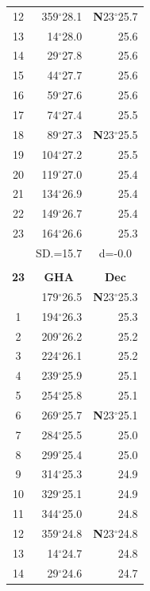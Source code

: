 \documentclass[10pt, a4paper]{report}
\begin{document}
\begin{scriptsize}
\begin{tabular*}{0.2\textwidth}[t]{@{\extracolsep{\fill}}|c|rr|}
12 & 359$^\circ$28.1 & \textbf{N}23$^\circ$25.7\\
13 & 14$^\circ$28.0 & 25.6\\
14 & 29$^\circ$27.8 & 25.6\\
15 & 44$^\circ$27.7 & \raisebox{0.24ex}{\boldmath$\cdot$~\boldmath$\cdot$~~}25.6\\
16 & 59$^\circ$27.6 & 25.6\\
17 & 74$^\circ$27.4 & 25.5\\[2Pt]
18 & 89$^\circ$27.3 & \textbf{N}23$^\circ$25.5\\
19 & 104$^\circ$27.2 & 25.5\\
20 & 119$^\circ$27.0 & 25.4\\
21 & 134$^\circ$26.9 & \raisebox{0.24ex}{\boldmath$\cdot$~\boldmath$\cdot$~~}25.4\\
22 & 149$^\circ$26.7 & 25.4\\
23 & 164$^\circ$26.6 & 25.3\\
\hline
\rule{0pt}{2.4ex} & \multicolumn{1}{c}{SD.=15.7} & \multicolumn{1}{c|}{d=-0.0}\\
\hline
\multicolumn{1}{c}{}\\[-0.5ex]\hline
\multicolumn{1}{|c|}{\rule{0pt}{2.6ex}\textbf{23}} & \multicolumn{1}{c}{\textbf{GHA}} & \multicolumn{1}{c|}{\textbf{Dec}}\\
\hline\rule{0pt}{2.6ex}\noindent
0 & 179$^\circ$26.5 & \textbf{N}23$^\circ$25.3\\
1 & 194$^\circ$26.3 & 25.3\\
2 & 209$^\circ$26.2 & 25.2\\
3 & 224$^\circ$26.1 & \raisebox{0.24ex}{\boldmath$\cdot$~\boldmath$\cdot$~~}25.2\\
4 & 239$^\circ$25.9 & 25.1\\
5 & 254$^\circ$25.8 & 25.1\\[2Pt]
6 & 269$^\circ$25.7 & \textbf{N}23$^\circ$25.1\\
7 & 284$^\circ$25.5 & 25.0\\
8 & 299$^\circ$25.4 & 25.0\\
9 & 314$^\circ$25.3 & \raisebox{0.24ex}{\boldmath$\cdot$~\boldmath$\cdot$~~}24.9\\
10 & 329$^\circ$25.1 & 24.9\\
11 & 344$^\circ$25.0 & 24.8\\[2Pt]
12 & 359$^\circ$24.8 & \textbf{N}23$^\circ$24.8\\
13 & 14$^\circ$24.7 & 24.8\\
14 & 29$^\circ$24.6 & 24.7\\

\end{tabular*}
\end{scriptsize}
\end{document}
